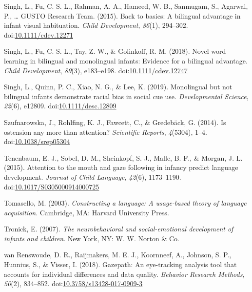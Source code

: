 \documentclass[,man,floatsintext]{apa6}
\begin{document}
\leavevmode\hypertarget{ref-Singh_etal_2015}{}%
Singh, L., Fu, C. S. L., Rahman, A. A., Hameed, W. B., Sanmugam, S., Agarwal, P., \ldots{} GUSTO Research Team. (2015). Back to basics: A bilingual advantage in infant visual habituation. \emph{Child Development}, \emph{86}(1), 294--302. doi:\href{https://doi.org/10.1111/cdev.12271}{10.1111/cdev.12271}

\leavevmode\hypertarget{ref-Singh_etal_2018}{}%
Singh, L., Fu, C. S. L., Tay, Z. W., \& Golinkoff, R. M. (2018). Novel word learning in bilingual and monolingual infants: Evidence for a bilingual advantage. \emph{Child Development}, \emph{89}(3), e183--e198. doi:\href{https://doi.org/10.1111/cdev.12747}{10.1111/cdev.12747}

\leavevmode\hypertarget{ref-Singh_etal_2019}{}%
Singh, L., Quinn, P. C., Xiao, N. G., \& Lee, K. (2019). Monolingual but not bilingual infants demonstrate racial bias in social cue use. \emph{Developmental Science}, \emph{22}(6), e12809. doi:\href{https://doi.org/10.1111/desc.12809}{10.1111/desc.12809}

\leavevmode\hypertarget{ref-Szufnarowska_etal_2014}{}%
Szufnarowska, J., Rohlfing, K. J., Fawcett, C., \& Gredebäck, G. (2014). Is ostension any more than attention? \emph{Scientific Reports}, \emph{4}(5304), 1--4. doi:\href{https://doi.org/10.1038/srep05304}{10.1038/srep05304}

\leavevmode\hypertarget{ref-Tenenbaum_etal_2015}{}%
Tenenbaum, E. J., Sobel, D. M., Sheinkopf, S. J., Malle, B. F., \& Morgan, J. L. (2015). Attention to the mouth and gaze following in infancy predict language development. \emph{Journal of Child Language}, \emph{42}(6), 1173--1190. doi:\href{https://doi.org/10.1017/S0305000914000725}{10.1017/S0305000914000725}

\leavevmode\hypertarget{ref-Tomasello_2003}{}%
Tomasello, M. (2003). \emph{Constructing a language: A usage-based theory of language acquisition}. Cambridge, MA: Harvard University Press.

\leavevmode\hypertarget{ref-Tronick_2007}{}%
Tronick, E. (2007). \emph{The neurobehavioral and social-emotional development of infants and children}. New York, NY: W. W. Norton \& Co.

\leavevmode\hypertarget{ref-vanRenswoude_etal_2018}{}%
van Renswoude, D. R., Raijmakers, M. E. J., Koornneef, A., Johnson, S. P., Hunnius, S., \& Visser, I. (2018). Gazepath: An eye-tracking analysis tool that accounts for individual differences and data quality. \emph{Behavior Research Methods}, \emph{50}(2), 834--852. doi:\href{https://doi.org/10.3758/s13428-017-0909-3}{10.3758/s13428-017-0909-3}
\end{document}
